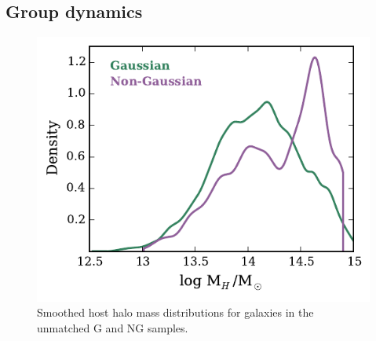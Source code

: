 \documentclass[a4paper,fleqn,usenatbib]{mnras}
\begin{document}
\subsection{Group dynamics}
\label{sec:grp_dyn}

\begin{figure}
  \centering
  \includegraphics[width=\columnwidth]{mhdist_um.pdf}
  \caption{Smoothed host halo mass distributions for galaxies in the
    unmatched G and NG samples.}
  \label{fig:mhdist_um}
\end{figure}
\end{document}
